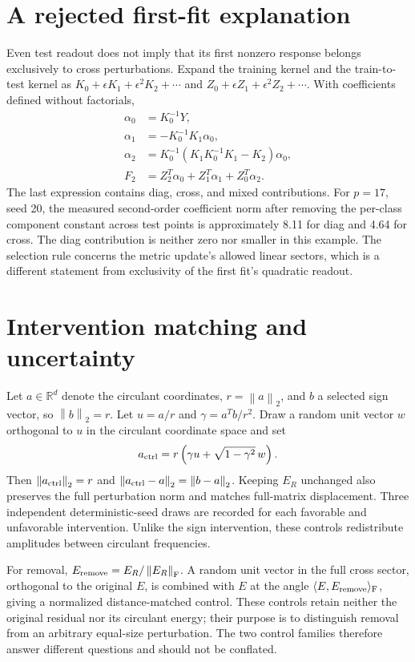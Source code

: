 \documentclass[11pt]{article}
\newcommand{\R}{\mathbb R}
\newcommand{\norm}[1]{\left\lVert#1\right\rVert}
\newcommand{\Frob}{\mathrm F}
\begin{document}
\section{A rejected first-fit explanation}\label{app:taylor}
Even test readout does not imply that its first nonzero response belongs exclusively to cross perturbations. Expand the training kernel and the train-to-test kernel as $K_0+\epsilon K_1+\epsilon^2K_2+\cdots$ and $Z_0+\epsilon Z_1+\epsilon^2Z_2+\cdots$. With coefficients defined without factorials,
\begin{align}
 \alpha_0&=K_0^{-1}Y,\\
 \alpha_1&=-K_0^{-1}K_1\alpha_0,\\
 \alpha_2&=K_0^{-1}(K_1K_0^{-1}K_1-K_2)\alpha_0,\\
 F_2&=Z_2^T\alpha_0+Z_1^T\alpha_1+Z_0^T\alpha_2.
\end{align}
The last expression contains diag, cross, and mixed contributions. For $p=17$, seed 20, the measured second-order coefficient norm after removing the per-class component constant across test points is approximately 8.11 for diag and 4.64 for cross. The diag contribution is neither zero nor smaller in this example. The selection rule concerns the metric update's allowed linear sectors, which is a different statement from exclusivity of the first fit's quadratic readout.

\section{Intervention matching and uncertainty}\label{app:controls}
Let $a\in\R^d$ denote the circulant coordinates, $r=\norm{a}_2$, and $b$ a selected sign vector, so $\norm{b}_2=r$. Let $u=a/r$ and $\gamma=a^Tb/r^2$. Draw a random unit vector $w$ orthogonal to $u$ in the circulant coordinate space and set
\begin{equation}
 a_{\rm ctrl}=r\left(\gamma u+\sqrt{1-\gamma^2}\,w\right).
\end{equation}
Then $\norm{a_{\rm ctrl}}_2=r$ and $\norm{a_{\rm ctrl}-a}_2=\norm{b-a}_2$. Keeping $E_R$ unchanged also preserves the full perturbation norm and matches full-matrix displacement. Three independent deterministic-seed draws are recorded for each favorable and unfavorable intervention. Unlike the sign intervention, these controls redistribute amplitudes between circulant frequencies.

For removal, $E_{\rm remove}=E_R/\norm{E_R}_{\Frob}$. A random unit vector in the full cross sector, orthogonal to the original $E$, is combined with $E$ at the angle $\langle E,E_{\rm remove}\rangle_{\Frob}$, giving a normalized distance-matched control. These controls retain neither the original residual nor its circulant energy; their purpose is to distinguish removal from an arbitrary equal-size perturbation. The two control families therefore answer different questions and should not be conflated.
\end{document}
